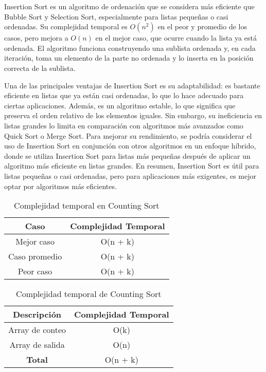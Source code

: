 Insertion Sort es un algoritmo de ordenación que se considera más eficiente que Bubble Sort y Selection Sort, especialmente para listas pequeñas o casi ordenadas. Su complejidad temporal es \(O(n^2)\) en el peor y promedio de los casos, pero mejora a \(O(n)\) en el mejor caso, que ocurre cuando la lista ya está ordenada. El algoritmo funciona construyendo una sublista ordenada y, en cada iteración, toma un elemento de la parte no ordenada y lo inserta en la posición correcta de la sublista. 

Una de las principales ventajas de Insertion Sort es su adaptabilidad: es bastante eficiente en listas que ya están casi ordenadas, lo que lo hace adecuado para ciertas aplicaciones. Además, es un algoritmo estable, lo que significa que preserva el orden relativo de los elementos iguales. Sin embargo, su ineficiencia en listas grandes lo limita en comparación con algoritmos más avanzados como Quick Sort o Merge Sort. Para mejorar su rendimiento, se podría considerar el uso de Insertion Sort en conjunción con otros algoritmos en un enfoque híbrido, donde se utiliza Insertion Sort para listas más pequeñas después de aplicar un algoritmo más eficiente en listas grandes. En resumen, Insertion Sort es útil para listas pequeñas o casi ordenadas, pero para aplicaciones más exigentes, es mejor optar por algoritmos más eficientes.

\begin{table}[h]
    \centering
    \begin{tabular}{|c|c|}
        \hline
        \textbf{Caso} & \textbf{Complejidad Temporal} \\
        \hline
        Mejor caso & O(n + k) \\
        \hline
        Caso promedio & O(n + k) \\
        \hline
        Peor caso & O(n + k) \\
        \hline
    \end{tabular}
    \caption{Complejidad temporal en Counting Sort}
    \label{tab:complejidad_rango}
\end{table}

\begin{table}[h]
    \centering
    \begin{tabular}{|c|c|}
        \hline
        \textbf{Descripción} & \textbf{Complejidad Temporal} \\
        \hline
        Array de conteo & O(k) \\
        \hline
        Array de salida & O(n) \\
        \hline
        \textbf{Total} & O(n + k) \\
        \hline
    \end{tabular}
    \caption{Complejidad temporal de Counting Sort}
    \label{tab:complejidad_total}
\end{table}

